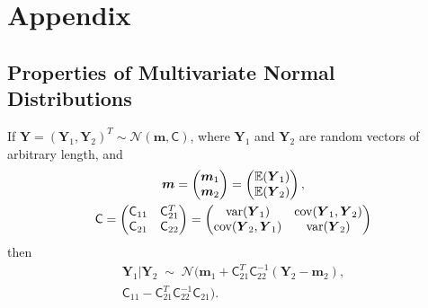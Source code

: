 \documentclass[twocolumn]{svjour3}          %
\newcommand{\bm}[1]{\boldsymbol{#1}}
\newcommand{\Ex}{\mathbb{E}}
\newcommand{\vm}{\bm{m}}
\newcommand{\vY}{\bm{Y}}
\newcommand{\mC}{\mathsf{C}}
\newcommand{\cov}{{\textup{cov}}}
\newcommand{\var}{{\textup{var}}}
\newcommand{\calN}{\mathcal{N}}
\begin{document}
\section{Appendix}

\iffalse
\subsection{Properties of Multivariate Normal Distributions}


\begin{lemma} \label{thrm:condDist} If $\vY = (\vY_1, \vY_2)^T \sim \calN (\vm,\mC)$, where $\vY_1$ and $\vY_2$ are random vectors of arbitrary length, and 
\begin{gather*}
	\vm = \begin{pmatrix} \vm_1 \\ \vm_2 \end{pmatrix} = \begin{pmatrix} \Ex(\vY_1) \\ \Ex(\vY_2) \end{pmatrix}, \\
	\mC = \begin{pmatrix}
	\mC_{11} & \mC_{21}^T \\ 	\mC_{21} & \mC_{22}
	\end{pmatrix} =
	 \begin{pmatrix}
	\var(\vY_{1}) & \cov(\vY_{1}, \vY_2) \\ 	\cov(\vY_2,\vY_{1}) & \var(\vY_{2})
	\end{pmatrix} 
	\end{gather*}
	then 
	\begin{multline*}
	\vY_1 \vert \vY_2 \; \sim \; \calN \bigl(\vm_1 + \mC_{21}^T \mC_{22}^{-1}(\vY_2 - \vm_2), \\ \mC_{11} - \mC_{21}^T \mC_{22}^{-1} \mC_{21} \bigr).
	\end{multline*}
	
\end{lemma}
\end{document}
